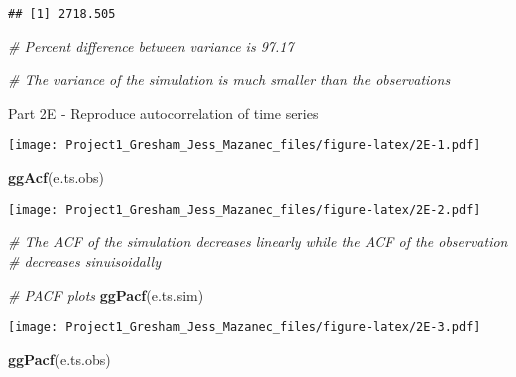 \documentclass[
]{article}
\newenvironment{Shaded}{\begin{snugshade}}{\end{snugshade}}
\newcommand{\CommentTok}[1]{\textcolor[rgb]{0.56,0.35,0.01}{\textit{#1}}}
\newcommand{\KeywordTok}[1]{\textcolor[rgb]{0.13,0.29,0.53}{\textbf{#1}}}
\newcommand{\NormalTok}[1]{#1}
\newcommand{\OperatorTok}[1]{\textcolor[rgb]{0.81,0.36,0.00}{\textbf{#1}}}
\newcommand{\StringTok}[1]{\textcolor[rgb]{0.31,0.60,0.02}{#1}}
\begin{document}
\begin{verbatim}
## [1] 2718.505
\end{verbatim}

\begin{Shaded}
\begin{Highlighting}[]
\CommentTok{# Percent difference between variance is 97.17}

\CommentTok{# The variance of the simulation is much smaller than the observations}
\end{Highlighting}
\end{Shaded}

Part 2E - Reproduce autocorrelation of time series

\begin{Shaded}
\end{Shaded}

\texttt{[image: Project1\_Gresham\_Jess\_Mazanec\_files/figure-latex/2E-1.pdf]}

\begin{Shaded}
\begin{Highlighting}[]
\KeywordTok{ggAcf}\NormalTok{(e.ts.obs)}
\end{Highlighting}
\end{Shaded}

\texttt{[image: Project1\_Gresham\_Jess\_Mazanec\_files/figure-latex/2E-2.pdf]}

\begin{Shaded}
\begin{Highlighting}[]
\CommentTok{# The ACF of the simulation decreases linearly while the ACF of the observation}
\CommentTok{# decreases sinuisoidally}

\CommentTok{# PACF plots}
\KeywordTok{ggPacf}\NormalTok{(e.ts.sim)}
\end{Highlighting}
\end{Shaded}

\texttt{[image: Project1\_Gresham\_Jess\_Mazanec\_files/figure-latex/2E-3.pdf]}

\begin{Shaded}
\begin{Highlighting}[]
\KeywordTok{ggPacf}\NormalTok{(e.ts.obs)}
\end{Highlighting}
\end{Shaded}
\end{document}

